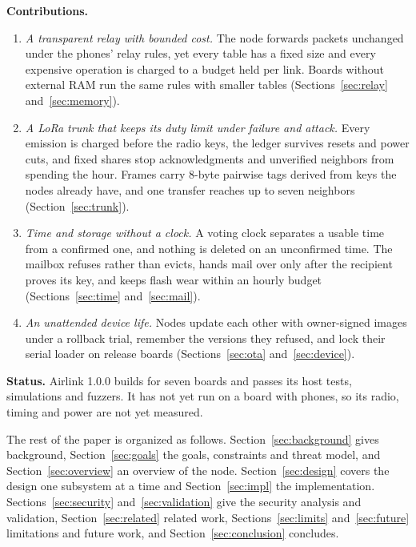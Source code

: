 \documentclass[conference]{IEEEtran}
\begin{document}
\textbf{Contributions.}
\begin{enumerate}
\item \emph{A transparent relay with bounded cost.} The node forwards packets unchanged under the phones' relay rules, yet every table has a fixed size and every expensive operation is charged to a budget held per link. Boards without external RAM run the same rules with smaller tables (Sections~\ref{sec:relay} and~\ref{sec:memory}).
\item \emph{A LoRa trunk that keeps its duty limit under failure and attack.} Every emission is charged before the radio keys, the ledger survives resets and power cuts, and fixed shares stop acknowledgments and unverified neighbors from spending the hour. Frames carry 8-byte pairwise tags derived from keys the nodes already have, and one transfer reaches up to seven neighbors (Section~\ref{sec:trunk}).
\item \emph{Time and storage without a clock.} A voting clock separates a usable time from a confirmed one, and nothing is deleted on an unconfirmed time. The mailbox refuses rather than evicts, hands mail over only after the recipient proves its key, and keeps flash wear within an hourly budget (Sections~\ref{sec:time} and~\ref{sec:mail}).
\item \emph{An unattended device life.} Nodes update each other with owner-signed images under a rollback trial, remember the versions they refused, and lock their serial loader on release boards (Sections~\ref{sec:ota} and~\ref{sec:device}).
\end{enumerate}

\textbf{Status.} Airlink 1.0.0 builds for seven boards and passes its host tests, simulations and fuzzers. It has not yet run on a board with phones, so its radio, timing and power are not yet measured.

The rest of the paper is organized as follows. Section~\ref{sec:background} gives background, Section~\ref{sec:goals} the goals, constraints and threat model, and Section~\ref{sec:overview} an overview of the node. Section~\ref{sec:design} covers the design one subsystem at a time and Section~\ref{sec:impl} the implementation. Sections~\ref{sec:security} and~\ref{sec:validation} give the security analysis and validation, Section~\ref{sec:related} related work, Sections~\ref{sec:limits} and~\ref{sec:future} limitations and future work, and Section~\ref{sec:conclusion} concludes.

\end{document}

